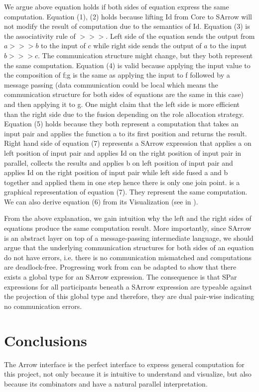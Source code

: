 We argue above equation holds if both sides of equation express the same computation. Equation (1), (2) holds because lifting Id from Core to SArrow will not modify the result of computation due to the semantics of Id. Equation (3) is the associativity rule of $>>>$. Left side of the equation sends the output from $a >>> b$ to the input of $c$ while right side sends the output of $a$ to the input $b >>> c$. The communication structure might change, but they both represent the same computation. Equation (4) is valid because applying the input value to the composition of f;g is the same as applying the input to f followed by a message passing (data communication could be local which means the communication structure for both sides of equations are the same in this case) and then applying it to g. One might claim that the left side is more efficient than the right side due to the fusion depending on the role allocation strategy. Equation (5) holds because they both represent a computation that takes an input pair and applies the function a to its first position and returns the result. Right hand side of equation (7) represents a SArrow expression that applies a on left position of input pair and applies Id on the right position of input pair in parallel, collects the results and applies b on left position of input pair and applies Id on the right position of input pair while left side fused a and b together and applied them in one step hence there is only one join point.  is a graphical representation of equation (7). They represent the same computation. We can also derive equation (6) from its Visualization (see in ).

From the above explanation, we gain intuition why the left and the right sides of equations produce the same computation result. More importantly, since SArrow is an abstract layer on top of a message-passing intermediate language, we should argue that the underlying communication structures for both sides of an equation do not have errors, i.e. there is no communication mismatched and computations are deadlock-free. Progressing work from \cite{castroAlgebraicMultipartyProtocol} can be adapted to show that there exists a global type for an SArrow expression. The consequence is that SPar expressions for all participants beneath a SArrow expression are typeable against the projection of this global type and therefore, they are dual pair-wise indicating no communication errors.

\section{Conclusions}
The Arrow interface is the perfect interface to express general computation for this pro\-ject, not only because it is intuitive to understand and visualize, but also because its combinators \hask{***} and \hask{&&&} have a natural parallel interpretation. 


